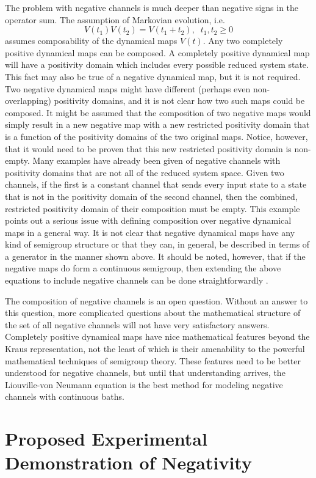 The problem with negative channels is much deeper than negative signs in the operator sum.  The assumption of Markovian evolution, i.e.\
$$
V(t_1)V(t_2) = V(t_1+t_2),\;\;t_1,t_2\ge 0
$$ 
assumes composability of the dynamical maps $V(t)$.  Any two completely positive dynamical maps can be composed.  A completely positive dynamical map will have a positivity domain which includes every possible reduced system state.  This fact may also be true of a negative dynamical map, but it is not required.  Two negative dynamical maps might have different (perhaps even non-overlapping) positivity domains, and it is not clear how two such maps could be composed.  It might be assumed that the composition of two negative maps would simply result in a new negative map with a new restricted positivity domain that is a function of the positivity domains of the two original maps.  Notice, however, that it would need to be proven that this new restricted positivity domain is non-empty.  Many examples have already been given of negative channels with positivity domains that are not all of the reduced system space.  Given two channels, if the first is a constant channel that sends every input state to a state that is not in the positivity domain of the second channel, then the combined, restricted positivity domain of their composition must be empty.  This example points out a serious issue with defining composition over negative dynamical maps in a general way.  It is not clear that negative dynamical maps have any kind of semigroup structure or that they can, in general, be described in terms of a generator in the manner shown above.  It should be noted, however, that if the negative maps do form a continuous semigroup, then extending the above equations to include negative channels can be done straightforwardly \cite{Shaji2005}.

The composition of negative channels is an open question.  Without an answer to this question, more complicated questions about the mathematical structure of the set of all negative channels will not have very satisfactory answers.  Completely positive dynamical maps have nice mathematical features beyond the Kraus representation, not the least of which is their amenability to the powerful mathematical techniques of semigroup theory.  These features need to be better understood for negative channels, but until that understanding arrives, the Liouville-von Neumann equation is the best method for modeling negative channels with continuous baths.

\chapter{Proposed Experimental Demonstration of Negativity}
\label{sec:proposedexp}

